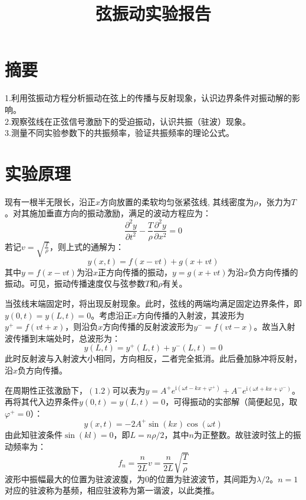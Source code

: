 \documentclass{ctexart}
\title{弦振动实验报告}
\begin{document}
\maketitle

\section*{摘要}
\noindent 1.利用弦振动方程分析振动在弦上的传播与反射现象，认识边界条件对振动解的影响。\\ 
\noindent 2.观察弦线在正弦信号激励下的受迫振动，认识共振（驻波）现象。\\
\noindent 3.测量不同实验参数下的共振频率，验证共振频率的理论公式。

\section{实验原理}
现有一根半无限长，沿正$x$方向放置的柔软均匀张紧弦线, 其线密度为$\rho$，张力为$T$。对其施加垂直方向的振动激励，满足的波动方程应为：
\begin{equation}
  \displaystyle\frac{\partial^2y}{\partial t^2}-\frac{T}{\rho}\frac{\partial^2y}{\partial x^2}=0
\end{equation}
若记$v=\displaystyle\sqrt{\frac{T}{\rho}}$，则上式的通解为：
\begin{equation}
  y(x,t)=f(x-vt)+g(x+vt)
\end{equation}
其中$y=f(x-vt)$为沿$x$正方向传播的振动，$y=g(x+vt)$为沿$x$负方向传播的振动。可见，振动传播速度仅与弦参数$T$和$\rho$有关。

\indent 当弦线末端固定时，将出现反射现象。此时，弦线的两端均满足固定边界条件，即$y(0,t)=y(L,t)=0$。考虑沿正$x$方向传播的入射波，其波形为$y^+=f(vt+x)$，则沿负$x$方向传播的反射波波形为$y^-=f(vt-x)$。故当入射波传播到末端处时，总波形为：
\begin{equation}
  y(L,t)=y^+(L,t)+y^-(L,t)=0
\end{equation}
此时反射波与入射波大小相同，方向相反，二者完全抵消。此后叠加脉冲将反射，沿$x$负方向传播。

\indent 在周期性正弦激励下，$(1.2)$可以表为$y=A^+e^{\mathrm{i}(\omega t-kx+\varphi^+)}+A^-e^{\mathrm{i}(\omega t+kx+\varphi^-)}$。再将其代入边界条件$y(0,t)=y(L,t)=0$，可得振动的实部解（简便起见，取$\varphi^+=0$）：
\begin{equation}
  y(x,t)=-2A^+\sin(kx)\cos(\omega t)
\end{equation}
由此知驻波条件$\sin(kl)=0$，即$L=n\rho/2$，其中$n$为正整数。故驻波时弦上的振动频率为：
\begin{equation}
  f_n=\displaystyle\frac{n}{2L}v=\displaystyle\frac{n}{2L}\displaystyle\sqrt{\frac{T}{\rho}}
\end{equation}
波形中振幅最大的位置为驻波波腹，为0的位置为驻波波节，其间距为$\lambda/2$。$n=1$对应的驻波称为基频，相应驻波称为第一谐波，以此类推。
\end{document}
